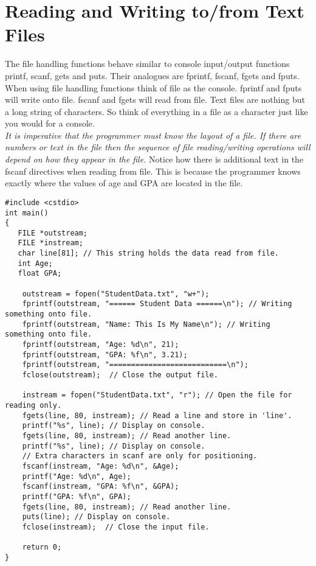 \documentclass[12pt,a4paper]{article}
\begin{document}
\section{Reading and Writing to/from Text Files}
The file handling functions behave similar to console input/output functions printf, scanf, gets and puts. Their analogues are fprintf, fscanf, fgets and fputs. When using file handling functions think of file as the console. fprintf and fputs will write onto file. fscanf and fgets will read from file. Text files are nothing but a long string of characters. So think of everything in a file as a character just like you would for a console.\\
\emph{It is imperative that the programmer must know the layout of a file. If there are numbers or text in the file then the sequence of file reading/writing operations will depend on how they appear in the file.} Notice how there is additional text in the fscanf directives when reading from file. This is because the programmer knows exactly where the values of age and GPA are located in the file.
\begin{lstlisting}[caption={File input and output}]
#include <cstdio>
int main()
{
   FILE *outstream;
   FILE *instream;
   char line[81]; // This string holds the data read from file.
   int Age;
   float GPA;

	outstream = fopen("StudentData.txt", "w+");
	fprintf(outstream, "====== Student Data ======\n"); // Writing something onto file.
	fprintf(outstream, "Name: This Is My Name\n"); // Writing something onto file.
	fprintf(outstream, "Age: %d\n", 21);
	fprintf(outstream, "GPA: %f\n", 3.21);
	fprintf(outstream, "===========================\n");
	fclose(outstream);  // Close the output file.
	
	instream = fopen("StudentData.txt", "r"); // Open the file for reading only.
	fgets(line, 80, instream); // Read a line and store in 'line'.
	printf("%s", line); // Display on console.
	fgets(line, 80, instream); // Read another line.
	printf("%s", line); // Display on console.
	// Extra characters in scanf are only for positioning.
	fscanf(instream, "Age: %d\n", &Age);
	printf("Age: %d\n", Age);
	fscanf(instream, "GPA: %f\n", &GPA);
	printf("GPA: %f\n", GPA);
	fgets(line, 80, instream); // Read another line.
	puts(line); // Display on console.
	fclose(instream);  // Close the input file.

	return 0;
}
\end{lstlisting}
\end{document}
